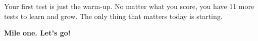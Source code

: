 {\begin{tcolorbox}[
    enhanced,
    colback=funYellowLight,
    colframe=funYellow!60,
    arc=10pt,
    boxrule=1pt,
    left=6mm, right=6mm, top=4mm, bottom=4mm,
]
\vspace{2mm}

Your first test is just the warm-up. No matter what you score, you have 11 more tests to learn and grow. The only thing that matters today is starting.
\end{tcolorbox}

\vspace{4mm}

\begin{center}
{\large\bfseries\color{funBlueDark} \faFlagCheckered\hspace{2mm}Mile one. Let's go!\hspace{2mm}\faFlagCheckered}
\end{center}

}
\newpage
